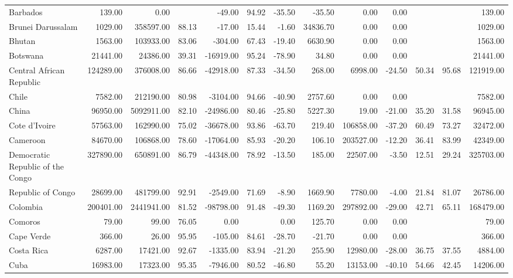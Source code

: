 \begin{table}[ht]
\begin{tabular}{lrrrrrrrrrrrr}
  Barbados & 139.00 & 0.00 &  & -49.00 & 94.92 & -35.50 & -35.50 & 0.00 & 0.00 &  &  & 139.00 \\ 
  Brunei Darussalam & 1029.00 & 358597.00 & 88.13 & -17.00 & 15.44 & -1.60 & 34836.70 & 0.00 & 0.00 &  &  & 1029.00 \\ 
  Bhutan & 1563.00 & 103933.00 & 83.06 & -304.00 & 67.43 & -19.40 & 6630.90 & 0.00 & 0.00 &  &  & 1563.00 \\ 
  Botswana & 21441.00 & 24386.00 & 39.31 & -16919.00 & 95.24 & -78.90 & 34.80 & 0.00 & 0.00 &  &  & 21441.00 \\ 
  Central African Republic & 124289.00 & 376008.00 & 86.66 & -42918.00 & 87.33 & -34.50 & 268.00 & 6998.00 & -24.50 & 50.34 & 95.68 & 121919.00 \\ 
  Chile & 7582.00 & 212190.00 & 80.98 & -3104.00 & 94.66 & -40.90 & 2757.60 & 0.00 & 0.00 &  &  & 7582.00 \\ 
  China & 96950.00 & 5092911.00 & 82.10 & -24986.00 & 80.46 & -25.80 & 5227.30 & 19.00 & -21.00 & 35.20 & 31.58 & 96945.00 \\ 
  Cote d'Ivoire & 57563.00 & 162990.00 & 75.02 & -36678.00 & 93.86 & -63.70 & 219.40 & 106858.00 & -37.20 & 60.49 & 73.27 & 32472.00 \\ 
  Cameroon & 84670.00 & 106868.00 & 78.60 & -17064.00 & 85.93 & -20.20 & 106.10 & 203527.00 & -12.20 & 36.41 & 83.99 & 42349.00 \\ 
  Democratic Republic of the Congo & 327890.00 & 650891.00 & 86.79 & -44348.00 & 78.92 & -13.50 & 185.00 & 22507.00 & -3.50 & 12.51 & 29.24 & 325703.00 \\ 
  Republic of Congo & 28699.00 & 481799.00 & 92.91 & -2549.00 & 71.69 & -8.90 & 1669.90 & 7780.00 & -4.00 & 21.84 & 81.07 & 26786.00 \\ 
  Colombia & 200401.00 & 2441941.00 & 81.52 & -98798.00 & 91.48 & -49.30 & 1169.20 & 297892.00 & -29.00 & 42.71 & 65.11 & 168479.00 \\ 
  Comoros & 79.00 & 99.00 & 76.05 & 0.00 &  & 0.00 & 125.70 & 0.00 & 0.00 &  &  & 79.00 \\ 
  Cape Verde & 366.00 & 26.00 & 95.95 & -105.00 & 84.61 & -28.70 & -21.70 & 0.00 & 0.00 &  &  & 366.00 \\ 
  Costa Rica & 6287.00 & 17421.00 & 92.67 & -1335.00 & 83.94 & -21.20 & 255.90 & 12980.00 & -28.00 & 36.75 & 37.55 & 4884.00 \\ 
  Cuba & 16983.00 & 17323.00 & 95.35 & -7946.00 & 80.52 & -46.80 & 55.20 & 13153.00 & -40.10 & 54.66 & 42.45 & 14206.00 \\ 

\end{tabular}
\end{table}
